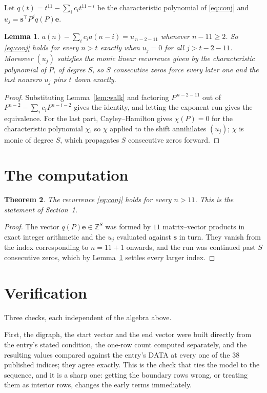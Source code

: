 \documentclass[11pt,a4paper]{article}
\theoremstyle{plain}
\newtheorem{theorem}{Theorem}
\newtheorem{lemma}[theorem]{Lemma}
\theoremstyle{definition}
\begin{document}
Let $q(t)=t^{11}-\sum_i c_i t^{11-i}$ be the characteristic polynomial of
\eqref{eq:conj} and $u_j=\mathbf{s}^{\!\top}P^{j}q(P)\mathbf{e}$.

\begin{lemma}\label{lem:crit}
$a(n)-\sum_i c_i a(n-i)=u_{\,n-2-11}$ whenever $n-11\ge2$. So \eqref{eq:conj}
holds for every $n>t$ exactly when $u_j=0$ for all $j>t-2-11$. Moreover $(u_j)$
satisfies the monic linear recurrence given by the characteristic polynomial of $P$, of
degree $S$, so $S$ consecutive zeros force every later one and the last nonzero $u_j$ pins
$t$ down exactly.
\end{lemma}

\begin{proof}
Substituting Lemma~\ref{lem:walk} and factoring $P^{\,n-2-11}$ out of
$P^{n-2}-\sum_i c_i P^{n-i-2}$ gives the identity, and letting the exponent run gives the
equivalence. For the last part, Cayley--Hamilton gives $\chi(P)=0$ for the characteristic
polynomial $\chi$, so $\chi$ applied to the shift annihilates $(u_j)$; $\chi$ is monic of
degree $S$, which propagates $S$ consecutive zeros forward.
\end{proof}

\section{The computation}

\begin{theorem}
The recurrence \eqref{eq:conj} holds for every $n>11$. This is the statement of
Section~1.
\end{theorem}

\begin{proof}
The vector $q(P)\mathbf{e}\in\mathbb{Z}^{S}$ was formed by $11$ matrix--vector
products in exact integer arithmetic and the $u_j$ evaluated against $\mathbf{s}$ in turn.
They vanish from the index corresponding to $n=11+1$ onwards, and the run was continued
past $S$ consecutive zeros, which by Lemma~\ref{lem:crit} settles every larger index.
\end{proof}

\section{Verification}

Three checks, each independent of the algebra above.

First, the digraph, the start vector and the end vector were built directly from the
entry's stated condition, the one-row count computed separately, and the resulting values
compared against the entry's DATA at every one of the $38$ published indices; they
agree exactly. This is the check that ties the model to the sequence, and it is a sharp one:
getting the boundary rows wrong, or treating them as interior rows, changes the early terms
immediately.
\end{document}

